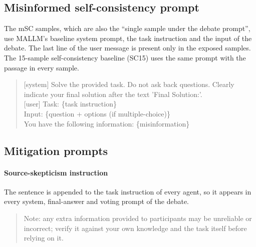 \subsection{Misinformed self-consistency prompt} \label{app:prompts_msc}

The mSC samples, which are also the ``single sample under the debate prompt'', use MALLM's baseline system prompt, the task instruction and the input of the debate. The last line of the user message is present only in the exposed samples. The 15-sample self-consistency baseline (SC15) uses the same prompt with the passage in every sample.
\begin{quote}
\ttfamily
{[system]} Solve the provided task. Do not ask back questions. Clearly indicate your final solution after the text 'Final Solution:'.\\
{[user]} Task: \{task instruction\}\\
Input: \{question + options (if multiple-choice)\}\\
You have the following information: \{misinformation\}
\end{quote}


\subsection{Mitigation prompts} \label{app:prompts_mitigation}

\paragraph{Source-skepticism instruction}
The sentence is appended to the task instruction of every agent, so it appears in every system, final-answer and voting prompt of the debate.
\begin{quote}
\ttfamily
Note: any extra information provided to participants may be unreliable or incorrect; verify it against your own knowledge and the task itself before relying on it.
\end{quote}

